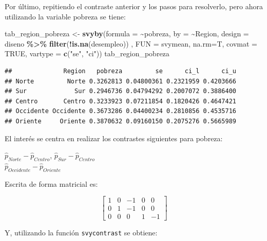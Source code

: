 \documentclass[
  12pt,
]{book}
\newenvironment{Shaded}{\begin{snugshade}}{\end{snugshade}}
\newcommand{\AttributeTok}[1]{\textcolor[rgb]{0.13,0.29,0.53}{#1}}
\newcommand{\ConstantTok}[1]{\textcolor[rgb]{0.56,0.35,0.01}{#1}}
\newcommand{\FunctionTok}[1]{\textcolor[rgb]{0.13,0.29,0.53}{\textbf{#1}}}
\newcommand{\NormalTok}[1]{#1}
\newcommand{\OtherTok}[1]{\textcolor[rgb]{0.56,0.35,0.01}{#1}}
\newcommand{\SpecialCharTok}[1]{\textcolor[rgb]{0.81,0.36,0.00}{\textbf{#1}}}
\newcommand{\StringTok}[1]{\textcolor[rgb]{0.31,0.60,0.02}{#1}}
\begin{document}
Por último, repitiendo el contraste anterior y los pasos para resolverlo, pero ahora utilizando la variable pobreza se tiene:

\begin{Shaded}
\begin{Highlighting}[]
\NormalTok{tab\_region\_pobreza }\OtherTok{\textless{}{-}} \FunctionTok{svyby}\NormalTok{(}\AttributeTok{formula =} \SpecialCharTok{\textasciitilde{}}\NormalTok{pobreza, }\AttributeTok{by =} \SpecialCharTok{\textasciitilde{}}\NormalTok{Region, }
                            \AttributeTok{design =}\NormalTok{ diseno }\SpecialCharTok{\%\textgreater{}\%} \FunctionTok{filter}\NormalTok{(}\SpecialCharTok{!}\FunctionTok{is.na}\NormalTok{(desempleo)) , }
                            \AttributeTok{FUN =}\NormalTok{ svymean, }\AttributeTok{na.rm=}\NormalTok{T, }\AttributeTok{covmat =} \ConstantTok{TRUE}\NormalTok{,}
                            \AttributeTok{vartype =} \FunctionTok{c}\NormalTok{(}\StringTok{"se"}\NormalTok{, }\StringTok{"ci"}\NormalTok{))}
\NormalTok{tab\_region\_pobreza}
\end{Highlighting}
\end{Shaded}

\begin{verbatim}
##              Region   pobreza         se      ci_l      ci_u
## Norte         Norte 0.3262813 0.04800361 0.2321959 0.4203666
## Sur             Sur 0.2946736 0.04794292 0.2007072 0.3886400
## Centro       Centro 0.3233923 0.07211854 0.1820426 0.4647421
## Occidente Occidente 0.3673286 0.04400234 0.2810856 0.4535716
## Oriente     Oriente 0.3870632 0.09160150 0.2075276 0.5665989
\end{verbatim}

El interés se centra en realizar los contrastes siguientes para pobreza:

\(\hat{p}_{Norte} - \hat{p}_{Centro}\),
\(\hat{p}_{Sur}-\hat{p}_{Centro}\)\\
\(\hat{p}_{Occidente}-\hat{p}_{Oriente}\)

Escrita de forma matricial es:

\[
\left[\begin{array}{ccccc}
1 & 0 & -1 & 0 & 0\\
0 & 1 & -1 & 0 & 0\\
0 & 0 & 0 & 1 & -1
\end{array}\right]
\]

Y, utilizando la función \texttt{svycontrast} se obtiene:
\end{document}
